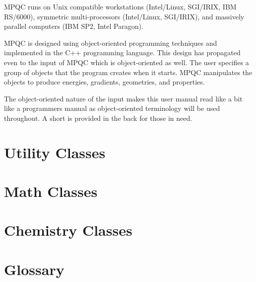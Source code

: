\documentclass[letterpaper%
              ]{report}
\begin{document}
MPQC runs on Unix compatible workstations (Intel/Linux, SGI/IRIX,
IBM RS/6000), symmetric multi-processors (Intel/Linux, SGI/IRIX),
and massively parallel computers (IBM SP2, Intel Paragon).

MPQC is designed using object-oriented programming techniques and
implemented in the C++ programming language.  This design has
propagated even to the input of MPQC which is object-oriented
as well.  The user specifies a group of objects that the program
creates when it starts.  MPQC manipulates the objects to produce
energies, gradients, geometries, and properties.

The object-oriented nature of the input makes this user manual read like a
bit like a programmers manual as object-oriented terminology will be used
throughout.  A short  is provided in the back
for those in need.







\chapter{Utility Classes}
\label{firstclasschapt}




\chapter{Math Classes}





\chapter{Chemistry Classes}
\label{lastclasschapt}








\begin{htmlonly}

\end{htmlonly}

\chapter*{Glossary}
\label{glossary}
\end{document}
